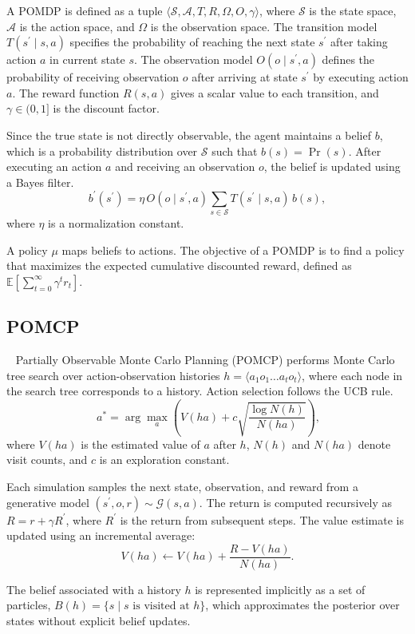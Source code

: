A POMDP is defined as a tuple $\langle \mathcal{S}, \mathcal{A}, T, R, \Omega, O, \gamma \rangle$, where $\mathcal{S}$ is the state space, $\mathcal{A}$ is the action space, and $\Omega$ is the observation space. The transition model $T(s^\prime \mid s, a)$ specifies the probability of reaching the next state $s^\prime$ after taking action $a$ in current state $s$. The observation model $O(o \mid s^\prime, a)$ defines the probability of receiving observation $o$ after arriving at state $s^\prime$ by executing action $a$. The reward function $R(s,a)$ gives a scalar value to each transition, and $\gamma \in (0,1]$ is the discount factor.

Since the true state is not directly observable, the agent maintains a belief $b$, which is a probability distribution over $\mathcal{S}$ such that $b(s) = \Pr(s)$. After executing an action $a$ and receiving an observation $o$, the belief is updated using a Bayes filter.
\[
b^\prime(s^\prime) = \eta \, O(o \mid s^\prime,a) \sum_{s \in \mathcal{S}} T(s^\prime \mid s,a) \, b(s),
\]
where $\eta$ is a normalization constant.

A policy $\mu$ maps beliefs to actions. The objective of a POMDP is to find a policy that maximizes the expected cumulative discounted reward, defined as $\mathbb{E}\left[\sum_{t=0}^{\infty} \gamma^t r_t \right]$.


\subsection{POMCP}~\label{preliminaries:POMCP}
Partially Observable Monte Carlo Planning (POMCP) performs Monte Carlo tree search over action-observation histories $h = \langle a_1 o_1 \dots a_t o_t \rangle$, where each node in the search tree corresponds to a history. Action selection follows the UCB rule.
\begin{equation}~\label{eq:ucb}
a^* = \arg\max_a \left( V(ha) + c \sqrt{\frac{\log N(h)}{N(ha)}} \right),
\end{equation}
where $V(ha)$ is the estimated value of $a$ after $h$, $N(h)$ and $N(ha)$ denote visit counts, and $c$ is an exploration constant.

Each simulation samples the next state, observation, and reward from a generative model $(s^\prime, o, r) \sim \mathcal{G}(s,a)$. The return is computed recursively as $R = r + \gamma R^\prime$, where $R^\prime$ is the return from subsequent steps. The value estimate is updated using an incremental average:
\[
V(ha) \leftarrow V(ha) + \frac{R - V(ha)}{N(ha)}.
\]

The belief associated with a history $h$ is represented implicitly as a set of particles, $B(h) = \{ s \mid s \text{ is visited at } h \}$, which approximates the posterior over states without explicit belief updates.

